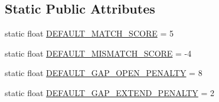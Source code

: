 \subsection*{Static Public Attributes}
\begin{DoxyCompactItemize}
\item 
static float \hyperlink{classumms_1_1core_1_1alignment_1_1_smith_waterman_alignment_a2f0dc35209fbabecd921df3ad9d83650}{D\+E\+F\+A\+U\+L\+T\+\_\+\+M\+A\+T\+C\+H\+\_\+\+S\+C\+O\+R\+E} = 5
\item 
static float \hyperlink{classumms_1_1core_1_1alignment_1_1_smith_waterman_alignment_aa04f65708e3485da9e6723b6d9233a68}{D\+E\+F\+A\+U\+L\+T\+\_\+\+M\+I\+S\+M\+A\+T\+C\+H\+\_\+\+S\+C\+O\+R\+E} = -\/4
\item 
static float \hyperlink{classumms_1_1core_1_1alignment_1_1_smith_waterman_alignment_ac3694eda6bf14934e74d2ca2b38ad4b5}{D\+E\+F\+A\+U\+L\+T\+\_\+\+G\+A\+P\+\_\+\+O\+P\+E\+N\+\_\+\+P\+E\+N\+A\+L\+T\+Y} = 8
\item 
static float \hyperlink{classumms_1_1core_1_1alignment_1_1_smith_waterman_alignment_ac92437bcbb7a7f20d1722aa001687586}{D\+E\+F\+A\+U\+L\+T\+\_\+\+G\+A\+P\+\_\+\+E\+X\+T\+E\+N\+D\+\_\+\+P\+E\+N\+A\+L\+T\+Y} = 2
\end{DoxyCompactItemize}


